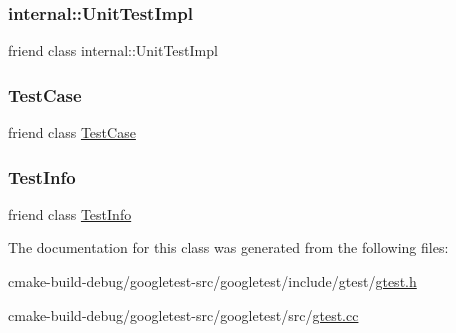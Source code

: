 \subsubsection{\texorpdfstring{internal::UnitTestImpl}{internal::UnitTestImpl}}
{\footnotesize\ttfamily friend class internal\+::\+Unit\+Test\+Impl\hspace{0.3cm}{\ttfamily [friend]}}

\mbox{\label{classtesting_1_1TestEventListeners_aff779e55b06adfa7c0088bd10253f0f0}} 
\subsubsection{\texorpdfstring{TestCase}{TestCase}}
{\footnotesize\ttfamily friend class \mbox{\hyperlink{classtesting_1_1TestCase}{Test\+Case}}\hspace{0.3cm}{\ttfamily [friend]}}

\mbox{\label{classtesting_1_1TestEventListeners_a4c49c2cdb6c328e6b709b4542f23de3c}} 
\subsubsection{\texorpdfstring{TestInfo}{TestInfo}}
{\footnotesize\ttfamily friend class \mbox{\hyperlink{classtesting_1_1TestInfo}{Test\+Info}}\hspace{0.3cm}{\ttfamily [friend]}}



The documentation for this class was generated from the following files\+:\begin{DoxyCompactItemize}
\item 
cmake-\/build-\/debug/googletest-\/src/googletest/include/gtest/\mbox{\hyperlink{gtest_8h}{gtest.\+h}}\item 
cmake-\/build-\/debug/googletest-\/src/googletest/src/\mbox{\hyperlink{gtest_8cc}{gtest.\+cc}}\end{DoxyCompactItemize}
